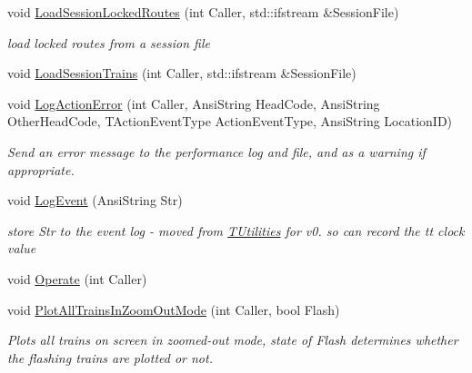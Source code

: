 \begin{DoxyCompactItemize}
\mbox{\label{class_t_train_controller_aefaafd5c6d1c51b4db9dd4b3646d0312}} 
void \mbox{\hyperlink{class_t_train_controller_aefaafd5c6d1c51b4db9dd4b3646d0312}{Load\+Session\+Locked\+Routes}} (int Caller, std\+::ifstream \&Session\+File)
\begin{DoxyCompactList}\small\item\em load locked routes from a session file \end{DoxyCompactList}\item 
void \mbox{\hyperlink{class_t_train_controller_a853ddf9799c9fd7063c81ffa1dc754d7}{Load\+Session\+Trains}} (int Caller, std\+::ifstream \&Session\+File)
\item 
\mbox{\label{class_t_train_controller_a9acd46962be476bc76c8d5ce59fff399}} 
void \mbox{\hyperlink{class_t_train_controller_a9acd46962be476bc76c8d5ce59fff399}{Log\+Action\+Error}} (int Caller, Ansi\+String Head\+Code, Ansi\+String Other\+Head\+Code, T\+Action\+Event\+Type Action\+Event\+Type, Ansi\+String Location\+ID)
\begin{DoxyCompactList}\small\item\em Send an error message to the performance log and file, and as a warning if appropriate. \end{DoxyCompactList}\item 
\mbox{\label{class_t_train_controller_ac88477499edd24550fae9b90b5561ed1}} 
void \mbox{\hyperlink{class_t_train_controller_ac88477499edd24550fae9b90b5561ed1}{Log\+Event}} (Ansi\+String Str)
\begin{DoxyCompactList}\small\item\em store Str to the event log -\/ moved from \mbox{\hyperlink{class_t_utilities}{T\+Utilities}} for v0. so can record the tt clock value \end{DoxyCompactList}\item 
void \mbox{\hyperlink{class_t_train_controller_a20a1576dea1d86ed78fc5e9f46343481}{Operate}} (int Caller)
\item 
\mbox{\label{class_t_train_controller_a2f9cd71b60b45de8380f5fad7bbd5dd8}} 
void \mbox{\hyperlink{class_t_train_controller_a2f9cd71b60b45de8380f5fad7bbd5dd8}{Plot\+All\+Trains\+In\+Zoom\+Out\+Mode}} (int Caller, bool Flash)
\begin{DoxyCompactList}\small\item\em Plots all trains on screen in zoomed-\/out mode, state of \textquotesingle{}Flash\textquotesingle{} determines whether the flashing trains are plotted or not. \end{DoxyCompactList}\item 

\end{DoxyCompactItemize}
